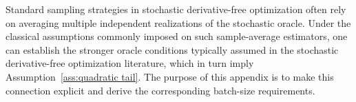 \documentclass[11pt,a4paper]{article}
\newcommand{\saraedit}[1]{{\color{red}{#1}\color{red}}}
\begin{document}
Standard sampling strategies in stochastic derivative-free optimization often rely on averaging multiple independent realizations of the stochastic oracle. Under the classical assumptions commonly imposed on such sample-average estimators, one can establish the stronger oracle conditions typically assumed in the stochastic derivative-free optimization literature, which in turn imply Assumption~\ref{ass:quadratic tail}. The purpose of this appendix is to make this connection explicit and derive the corresponding batch-size requirements.
\end{document}
